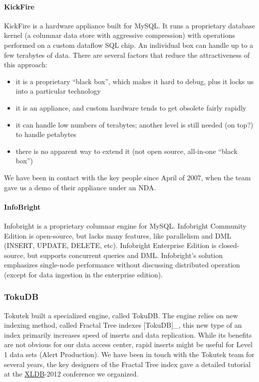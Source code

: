 \documentclass[DM,lsstdraft,toc]{lsstdoc}
\begin{document}
\paragraph{KickFire}\label{kickfire}

KickFire is a hardware appliance built for MySQL. It runs a proprietary
database kernel (a columnar data store with aggressive compression) with
operations performed on a custom dataflow SQL chip. An individual box
can handle up to a few terabytes of data. There are several factors that
reduce the attractiveness of this approach:

\begin{itemize}
\item
  it is a proprietary ``black box'', which makes it hard to debug, plus
  it locks us into a particular technology
\item
  it is an appliance, and custom hardware tends to get obsolete fairly
  rapidly
\item
  it can handle low numbers of terabytes; another level is still needed
  (on top?) to handle petabytes
\item
  there is no apparent way to extend it (not open source, all-in-one
  ``black box'')
\end{itemize}

We have been in contact with the key people since April of 2007, when
the team gave us a demo of their appliance under an NDA.

\paragraph{InfoBright}\label{infobright}

Infobright is a proprietary columnar engine for MySQL. Infobright
Community Edition is open-source, but lacks many features, like
parallelism and DML (INSERT, UPDATE, DELETE, etc). Infobright Enterprise
Edition is closed-source, but supports concurrent queries and DML.
Infobright's solution emphasizes single-node performance without
discussing distributed operation (except for data ingestion in the
enterprise edition).

\subsubsection{TokuDB}\label{tokudb}

Tokutek built a specialized engine, called TokuDB. The engine relies on
new indexing method, called Fractal Tree indexes {[}TokuDB{]}\_, this
new type of an index primarily increases speed of inserts and data
replication. While its benefits are not obvious for our data access
center, rapid inserts might be useful for Level 1 data sets (Alert
Production). We have been in touch with the Tokutek team for several
years, the key designers of the Fractal Tree index gave a detailed
tutorial at the \href{http://xldb.org}{XLDB}-2012 conference we
organized.
\end{document}
